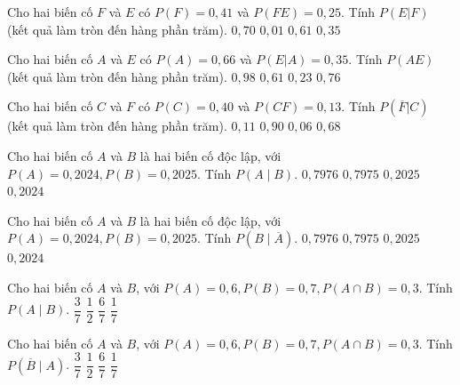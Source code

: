 \begin{ex}
	Cho hai biến cố ${F}$ và ${E}$ có $P(F)=0,41$ và $P(FE)= 0,25$. Tính $P(E|F)$ (kết quả làm tròn đến hàng phần trăm). 
	\choice
	{ ${0,70}$ }
	{ ${0,01}$ }
	{ \True ${0,61}$ }
	{ ${0,35}$ }
	\end{ex}
\begin{ex}
	Cho hai biến cố ${A}$ và ${E}$ có $P(A)=0,66$ và $P(E|A)=0,35$. Tính $P(AE)$ (kết quả làm tròn đến hàng phần trăm). 
	\choice
	{ ${0,98}$ }
	{ ${0,61}$ }
	{ \True ${0,23}$ }
	{ ${0,76}$ }
	\end{ex}
\begin{ex}
	Cho hai biến cố ${C}$ và ${F}$ có $P(C)=0,40$ và $P(CF)=0,13$. Tính $P(\overline{F}|C)$ (kết quả làm tròn đến hàng phần trăm). 
	\choice
	{ ${0,11}$ }
	{ ${0,90}$ }
	{ ${0,06}$ }
	{ \True ${0,68}$ }
	\end{ex}
\begin{ex}
	Cho hai biến cố $A$ và $B$ là hai biến cố độc lập, với $P(A)=0,2024, P(B)=0,2025$. Tính $P(A \mid B)$.
	\choice
	{ $ 0,7976$}
	{$0,7975$}
	{$0,2025$}
	{\True $0,2024$}
\end{ex} 

\begin{ex}
	Cho hai biến cố $A$ và $B$ là hai biến cố độc lập, với $P(A)=0,2024, P(B)=0,2025$. Tính $P(B \mid \overline{A})$.
	\choice
	{$0,7976$}
	{$0,7975$}
	{\True $0,2025$}
	{$0,2024$}
\end{ex} 

\begin{ex}
	Cho hai biến cố $A$ và $B$, với $P(A)=0,6, P(B)=0,7, P(A \cap B)=0,3$. Tính $P(A \mid B)$.
	\choice
	{\True $\dfrac{3}{7}$}
	{$\dfrac{1}{2}$}
	{$\dfrac{6}{7}$}
	{$\dfrac{1}{7}$}
\end{ex} 

\begin{ex}
	Cho hai biến cố $A$ và $B$, với $P(A)=0,6, P(B)=0,7, P(A \cap B)=0,3$. Tính $P(\overline{B} \mid A)$.
	\choice
	{$\dfrac{3}{7}$}
	{\True $\dfrac{1}{2}$}
	{$\dfrac{6}{7}$}
	{$\dfrac{1}{7}$}
\end{ex} 


